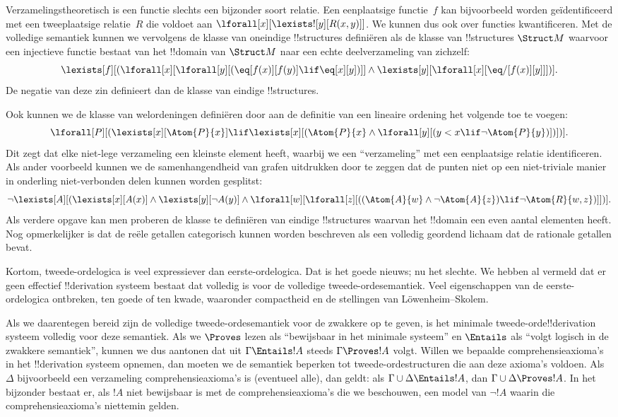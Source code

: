 \documentclass[openany]{memoir}
\begin{document}
Verzamelingstheoretisch is een functie slechts een bijzonder soort relatie.
Een eenplaatsige functie~$f$ kan bijvoorbeeld worden geïdentificeerd met een
tweeplaatsige relatie~$R$ die voldoet aan
$\lforall[x][\lexists![y][R(x,y)]]$. We kunnen dus ook over functies
kwantificeren. Met de volledige semantiek kunnen we vervolgens de klasse van
oneindige !!{structure}s definiëren als de klasse van !!{structure}s
$\Struct M$ waarvoor een injectieve functie bestaat van het !!{domain} van
$\Struct M$ naar een echte deelverzameling van zichzelf:
\[
\lexists[f][(\lforall[x][\lforall[y][(\eq[f(x)][f(y)] \lif \eq[x][y])]]
  \land \lexists[y][\lforall[x][\eq/[f(x)][y]]])].
\]
De negatie van deze zin definieert dan de klasse van eindige !!{structure}s.

Ook kunnen we de klasse van welordeningen definiëren door aan de definitie
van een lineaire ordening het volgende toe te voegen:
\[
\lforall[P][(\lexists[x][\Atom{P}{x}] \lif \lexists[x][(\Atom{P}{x}
    \land \lforall[y][(y < x \lif \lnot \Atom{P}{y})])])].
\]
Dit zegt dat elke niet-lege verzameling een kleinste element heeft, waarbij
we een ``verzameling'' met een eenplaatsige relatie identificeren. Als ander
voorbeeld kunnen we de samenhangendheid van grafen uitdrukken door te zeggen
dat de punten niet op een niet-triviale manier in onderling niet-verbonden
delen kunnen worden gesplitst:
\[
\lnot \lexists[A][(\lexists[x][A(x)] \land \lexists[y][\lnot A(y)]
  \land \lforall[w][\lforall[z][((\Atom{A}{w} \land \lnot \Atom{A}{z})
      \lif \lnot \Atom{R}{w,z})]])].
\]
Als verdere opgave kan men proberen de klasse te definiëren van eindige
!!{structure}s waarvan het !!{domain} een even aantal elementen heeft. Nog
opmerkelijker is dat de reële getallen categorisch kunnen worden beschreven
als een volledig geordend lichaam dat de rationale getallen bevat.

Kortom, tweede-ordelogica is veel expressiever dan eerste-ordelogica. Dat is
het goede nieuws; nu het slechte. We hebben al vermeld dat er geen effectief
!!{derivation} systeem bestaat dat volledig is voor de volledige
tweede-ordesemantiek. Veel eigenschappen van de eerste-ordelogica ontbreken,
ten goede of ten kwade, waaronder compactheid en de stellingen van
L\"owenheim--Skolem.

Als we daarentegen bereid zijn de volledige tweede-ordesemantiek voor de
zwakkere op te geven, is het minimale tweede-orde!!{derivation} systeem
volledig voor deze semantiek. Als we $\Proves$ lezen als ``bewijsbaar in het
minimale systeem'' en $\Entails$ als ``volgt logisch in de zwakkere
semantiek'', kunnen we dus aantonen dat uit $\Gamma \Entails !A$ steeds
$\Gamma \Proves !A$ volgt. Willen we bepaalde comprehensieaxioma's in het
!!{derivation} systeem opnemen, dan moeten we de semantiek beperken tot
tweede-ordestructuren die aan deze axioma's voldoen. Als $\Delta$
bijvoorbeeld een verzameling comprehensieaxioma's is (eventueel alle), dan
geldt: als $\Gamma \cup \Delta \Entails !A$, dan
$\Gamma \cup \Delta \Proves !A$. In het bijzonder bestaat er, als $!A$ niet
bewijsbaar is met de comprehensieaxioma's die we beschouwen, een model van
$\lnot !A$ waarin die comprehensieaxioma's niettemin gelden.
\end{document}
